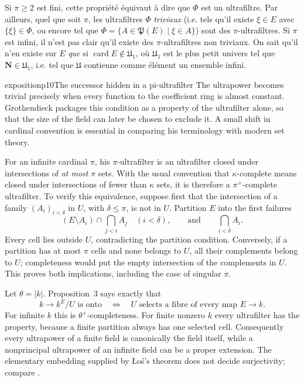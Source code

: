 Si $\pi\geqslant 2$ est fini, cette propriété équivaut à dire que $\Phi$ est un ultrafiltre. Par ailleurs, quel que soit $\pi$, les ultrafiltres $\Phi$ \textit{triviaux} (i.e. tels qu'il existe $\xi\in E$ avec $\{\xi\}\in\Phi$, ou encore tel que $\Phi=\{A\in\mathfrak{P}(E)\mid\xi\in A\}$) sont des $\pi$-ultrafiltres. Si $\pi$ est infini, il n'est pas clair qu'il existe des $\pi$-ultrafiltres non triviaux. On sait qu'il n'en existe sur $E$ \textit{que} si $\operatorname{card}E\notin\mathfrak{U}_1$, où $\mathfrak{U}_1$ est le plus petit univers tel que $\mathbf{N}\in\mathfrak{U}_1$, i.e. tel
que $\mathfrak{U}$ contienne comme élément un ensemble infini.

\begin{dcomment}{exposition}{p10}{The successor hidden in a pi-ultrafilter}
The ultrapower becomes trivial precisely when every function to the coefficient ring is almost constant. Grothendieck packages this condition as a property of the ultrafilter alone, so that the size of the field can later be chosen to exclude it. A small shift in cardinal convention is essential in comparing his terminology with modern set theory.

For an infinite cardinal $\pi$, his $\pi$-ultrafilter is an ultrafilter closed under intersections of \emph{at most} $\pi$ sets. With the usual convention that $\kappa$-complete means closed under intersections of fewer than $\kappa$ sets, it is therefore a $\pi^+$-complete ultrafilter. To verify this equivalence, suppose first that the intersection of a family $(A_i)_{i<\delta}$ in $U$, with $\delta\le\pi$, is not in $U$. Partition $E$ into the first failures
\[
 (E\setminus A_i)\cap\bigcap_{j<i}A_j
 \quad(i<\delta),
 \qquad\text{and}\qquad \bigcap_{i<\delta}A_i.
\]
Every cell lies outside $U$, contradicting the partition condition. Conversely, if a partition has at most $\pi$ cells and none belongs to $U$, all their complements belong to $U$; completeness would put the empty intersection of the complements in $U$. This proves both implications, including the case of singular $\pi$.

Let $\theta=|k|$. Proposition~3 says exactly that
\[
 k\longrightarrow k^E/U\text{ is onto}
 \quad\Longleftrightarrow\quad
 U\text{ selects a fibre of every map }E\longrightarrow k.
\]
For infinite $k$ this is $\theta^+$-completeness. For finite nonzero $k$ every ultrafilter has the property, because a finite partition always has one selected cell. Consequently every ultrapower of a finite field is canonically the field itself, while a nonprincipal ultrapower of an infinite field can be a proper extension. The elementary embedding supplied by \L o\'s's theorem does not decide surjectivity; compare \citet[Corollary~3.3]{Keisler2010Ultraproduct}.


\end{dcomment}

